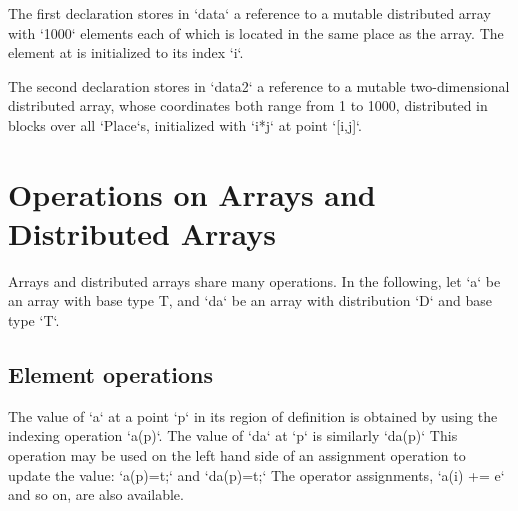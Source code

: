 {}\noindent 
The first declaration stores in \xcd`data` a reference to a mutable
distributed array with \xcd`1000` elements each of which is located in the
same place as the array. The element at \Xcd{[i]} is initialized to its index
\xcd`i`. 

The second declaration stores in \xcd`data2` a reference to a mutable
two-dimensional distributed array, whose coordinates both range from 1 to
1000, distributed in blocks over all \xcd`Place`s, 
initialized with \xcd`i*j`
at point \xcd`[i,j]`.



\section{Operations on Arrays and Distributed Arrays}

Arrays and distributed arrays share many operations.
In the following, let \xcd`a` be an array with base type T, and \xcd`da` be an
array with distribution \xcd`D` and base type \xcd`T`.




\subsection{Element operations}
The value of \xcd`a` at a point \xcd`p` in its region of definition is
obtained by using the indexing operation \xcd`a(p)`. 
The value of \xcd`da` at \xcd`p` is similarly
\xcd`da(p)`
This operation
may be used on the left hand side of an assignment operation to update
the value: 
\xcd`a(p)=t;`
and 
\xcd`da(p)=t;`
The operator assignments, \xcd`a(i) += e` and so on,  are also
available. 

